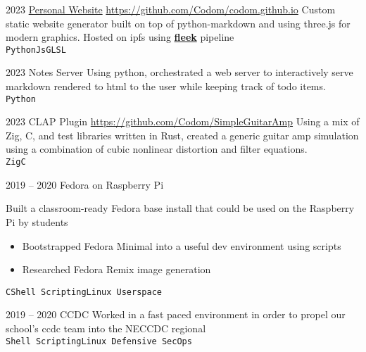 \documentclass[9pt]{developercv} %
\begin{document}

\begin{entrylist}
	\entry
	{2023}
	{\href{https://chrisodom.org/}{Personal Website}}
    {\href{https://github.com/Codom/codom.github.io}{https://github.com/Codom/codom.github.io}}
    {
        Custom static website generator built on top of python-markdown and using three.js for modern
	    graphics. Hosted on ipfs using \href{https://fleek.co}{\bf fleek} pipeline
	    \\
	    \texttt{Python}\slashsep\texttt{Js}\slashsep\texttt{GLSL}
    }

	\entry
	{2023}
	{Notes Server}
    {}
    {
        Using python, orchestrated a web server to interactively serve markdown rendered to
        html to the user while keeping track of todo items.
	    \\
	    \texttt{Python}
    }

	\entry
	{2023}
    {CLAP Plugin}
    {\href{https://github.com/Codom/SimpleGuitarAmp}{https://github.com/Codom/SimpleGuitarAmp}}
    {
        Using a mix of Zig, C, and test libraries written in Rust, created a generic guitar
        amp simulation using a combination of cubic nonlinear distortion and filter equations.
        \\
        \texttt{Zig}\slashsep\texttt{C}
    }

\end{entrylist}


\begin{entrylist}
	\entry
		{2019 -- 2020}
		{Fedora on Raspberry Pi}
        {}
        {
	Built a classroom-ready Fedora base install that could be used on the Raspberry Pi by students
	\begin{itemize}\itemsep=0em
		\item Bootstrapped Fedora Minimal into a useful dev environment using scripts
		\item Researched Fedora Remix image generation
	\end{itemize}
	\texttt{C}\slashsep\texttt{Shell Scripting}\slashsep\texttt{Linux Userspace}}
	\entry
		{2019 -- 2020}
		{CCDC}
        {}
        {Worked in a fast paced environment in order to propel our school's ccdc team into
	the NECCDC regional\\
        \texttt{Shell Scripting}\slashsep\texttt{Linux Defensive SecOps}}
\end{entrylist}

\end{document}
